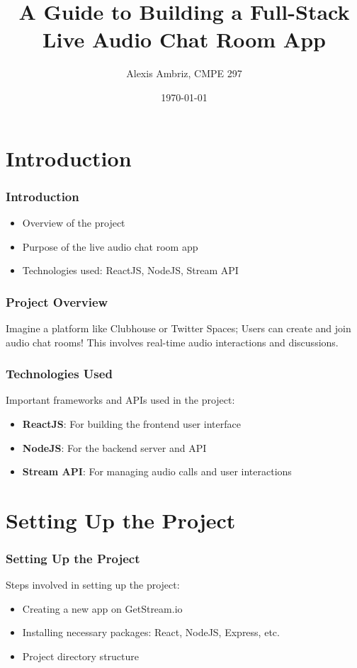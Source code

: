 \documentclass{beamer}
\title{A Guide to Building a Full-Stack Live Audio Chat Room App}
\author{Alexis Ambriz, CMPE 297}
\date{\today}
\begin{document}
\begin{frame}
    \titlepage
\end{frame}

\section{Introduction}

\begin{frame}
    \frametitle{Introduction}
    \begin{itemize}
        \item Overview of the project
        \item Purpose of the live audio chat room app
        \item Technologies used: ReactJS, NodeJS, Stream API
    \end{itemize}
\end{frame}

\begin{frame}
    \frametitle{Project Overview}
    Imagine a platform like Clubhouse or Twitter Spaces; Users can create and join audio chat rooms!
    This involves real-time audio interactions and discussions.
\end{frame}

\begin{frame}
    \frametitle{Technologies Used}
    Important frameworks and APIs used in the project:
    \begin{itemize}
        \item \textbf{ReactJS}: For building the frontend user interface
        \item \textbf{NodeJS}: For the backend server and API
        \item \textbf{Stream API}: For managing audio calls and user interactions
    \end{itemize}
\end{frame}

\section{Setting Up the Project}

\begin{frame}
    \frametitle{Setting Up the Project}
    Steps involved in setting up the project:
    \begin{itemize}
        \item Creating a new app on GetStream.io
        \item Installing necessary packages: React, NodeJS, Express, etc.
        \item Project directory structure
    \end{itemize}
\end{frame}
\end{document}
